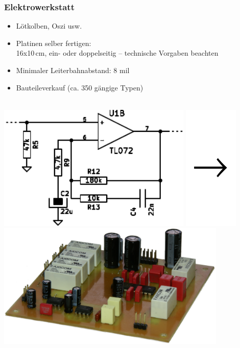\documentclass[t]{beamer}
\begin{document}
\begin{frame}
	\frametitle{Elektrowerkstatt}
	\begin{itemize}
		\item Lötkolben, Oszi usw.
		\item Platinen selber fertigen:\\
			16x10\,cm, ein- oder doppelseitig -- technische Vorgaben beachten
		\item Minimaler Leiterbahnabstand: 8 mil
		\item Bauteileverkauf (ca. 350 gängige Typen)
	\end{itemize}
		\begin{center}
	~\\
		\includegraphics[height=6cm]{../img/schaltplan.pdf}
		\includegraphics[height=6cm]{../img/pfeil.pdf}
		\includegraphics[height=6cm]{../img/platine_perspektivisch.png}
	\end{center}
\end{frame}
\end{document}
